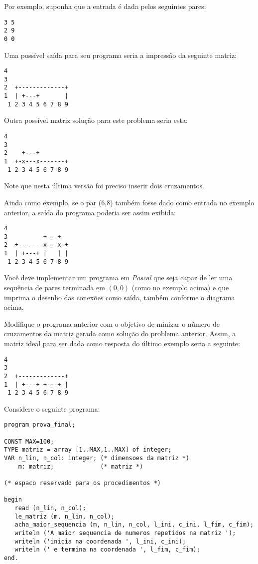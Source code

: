 Por exemplo, suponha que a entrada é dada pelos seguintes pares:

\begin{verbatim}
3 5
2 9
0 0
\end{verbatim}

Uma possível saída para seu programa seria a impressão da seguinte
matriz:

\begin{verbatim}
4
3         
2  +-------------+
1  | +---+       |
 1 2 3 4 5 6 7 8 9
\end{verbatim}

Outra possível matriz solução para este problema seria esta:
\begin{verbatim}
4
3         
2    +---+  
1  +-x---x-------+
 1 2 3 4 5 6 7 8 9
\end{verbatim}

Note que nesta última versão foi preciso inserir dois cruzamentos.

Ainda como exemplo, se o par (6,8) também fosse dado como entrada no 
exemplo anterior, a saída do programa poderia ser assim exibida:

\begin{verbatim}
4
3          +---+ 
2  +-------x---x-+
1  | +---+ |   | |
 1 2 3 4 5 6 7 8 9
\end{verbatim}

Você deve implementar um programa em \emph{Pascal} que seja
capaz de ler uma sequência de pares terminada em $(0,0)$ (como no
exemplo acima) e que imprima o desenho das conexões como saída,
também conforme o diagrama acima. 


\item 
Modifique o programa anterior com o objetivo de minizar o número de cruzamentos
da matriz gerada como solução do problema anterior. Assim,
a matriz ideal para ser dada como resposta do último exemplo
seria a seguinte:

\begin{verbatim}
4
3           
2  +-------------+
1  | +---+ +---+ |
 1 2 3 4 5 6 7 8 9
\end{verbatim}

\item Considere o seguinte programa:

\begin{lstlisting}
program prova_final;

CONST MAX=100;
TYPE matriz = array [1..MAX,1..MAX] of integer;
VAR n_lin, n_col: integer; (* dimensoes da matriz *)
    m: matriz;             (* matriz *)

(* espaco reservado para os procedimentos *)

begin
   read (n_lin, n_col);
   le_matriz (m, n_lin, n_col);
   acha_maior_sequencia (m, n_lin, n_col, l_ini, c_ini, l_fim, c_fim);
   writeln ('A maior sequencia de numeros repetidos na matriz ');
   writeln ('inicia na coordenada ', l_ini, c_ini);
   writeln (' e termina na coordenada ', l_fim, c_fim);
end.
\end{lstlisting}


